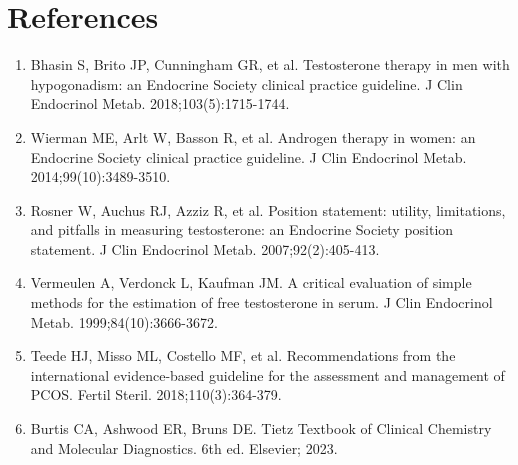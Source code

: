 \section*{References}
\begin{enumerate}
  \item Bhasin S, Brito JP, Cunningham GR, et al. Testosterone therapy in men with hypogonadism: an Endocrine Society clinical practice guideline. J Clin Endocrinol Metab. 2018;103(5):1715-1744.
  \item Wierman ME, Arlt W, Basson R, et al. Androgen therapy in women: an Endocrine Society clinical practice guideline. J Clin Endocrinol Metab. 2014;99(10):3489-3510.
  \item Rosner W, Auchus RJ, Azziz R, et al. Position statement: utility, limitations, and pitfalls in measuring testosterone: an Endocrine Society position statement. J Clin Endocrinol Metab. 2007;92(2):405-413.
  \item Vermeulen A, Verdonck L, Kaufman JM. A critical evaluation of simple methods for the estimation of free testosterone in serum. J Clin Endocrinol Metab. 1999;84(10):3666-3672.
  \item Teede HJ, Misso ML, Costello MF, et al. Recommendations from the international evidence-based guideline for the assessment and management of PCOS. Fertil Steril. 2018;110(3):364-379.
  \item Burtis CA, Ashwood ER, Bruns DE. Tietz Textbook of Clinical Chemistry and Molecular Diagnostics. 6th ed. Elsevier; 2023.
\end{enumerate}

\clearpage
